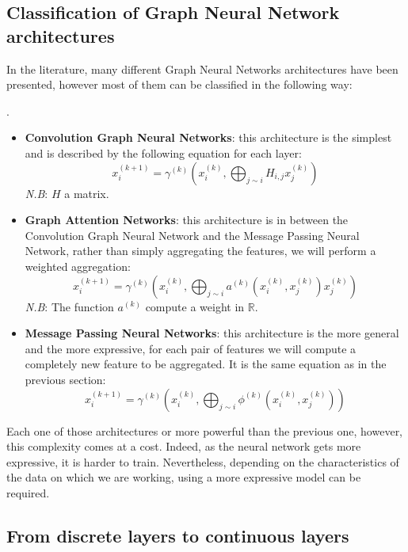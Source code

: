 \documentclass[12pt]{article}
\begin{document}
\subsection{Classification of Graph Neural Network architectures}
In the literature, many different Graph Neural Networks architectures have been presented, however most of them can be classified in the following way:

\begin{definition}.\\
    \begin{itemize}
        \item \textbf{Convolution Graph Neural Networks}: this architecture is the simplest and is described by the following equation for each layer:
        $$
        x_i^{(k+1)} = \gamma^{(k)}(x_i^{(k)}, \bigoplus_{j \sim i} H_{i,j}  x_j^{(k)})
        $$
         {\it N.B}: $H$ a matrix.
        \item \textbf{Graph Attention Networks}: this architecture is in between the Convolution Graph Neural Network and the Message Passing Neural Network, rather than simply aggregating the features, we will perform a weighted aggregation:
        $$
        x_i^{(k+1)} = \gamma^{(k)}(x_i^{(k)}, \bigoplus_{j \sim i} a^{(k)} (x_i^{(k)}, x_j^{(k)}) x_j^{(k)})
        $$
        {\it N.B}: The function $a^{(k)}$ compute a weight in $\mathbb{R}$.
        \item \textbf{Message Passing Neural Networks}: this architecture is the more general and the more expressive, for each pair of features we will compute a completely new feature to be aggregated. It is the same equation as in the previous section:
        $$
        x_i^{(k+1)} = \gamma^{(k)}(x_i^{(k)}, \bigoplus_{j \sim i} \phi^{(k)} (x_i^{(k)}, x_j^{(k)}))
        $$
    \end{itemize}
\end{definition}

Each one of those architectures or more powerful than the previous one, however, this complexity comes at a cost. Indeed, as the neural network gets more expressive, it is harder to train. Nevertheless, depending on the characteristics of the data on which we are working, using a more expressive model can be required.

\subsection{From discrete layers to continuous layers}
\end{document}
